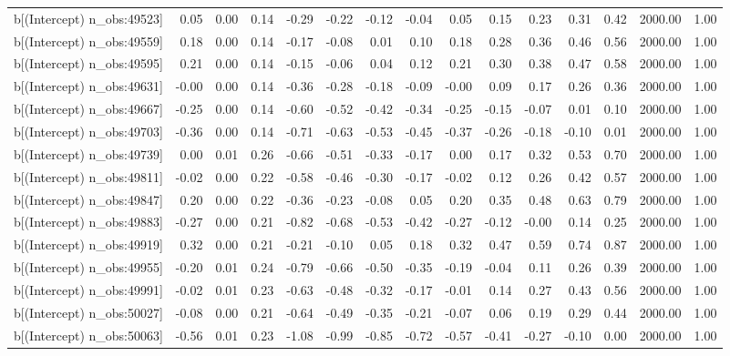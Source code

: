 \begin{table}[ht]
\begin{tabular}{rrrrrrrrrrrrrrr}
  b[(Intercept) n\_obs:49523] & 0.05 & 0.00 & 0.14 & -0.29 & -0.22 & -0.12 & -0.04 & 0.05 & 0.15 & 0.23 & 0.31 & 0.42 & 2000.00 & 1.00 \\ 
  b[(Intercept) n\_obs:49559] & 0.18 & 0.00 & 0.14 & -0.17 & -0.08 & 0.01 & 0.10 & 0.18 & 0.28 & 0.36 & 0.46 & 0.56 & 2000.00 & 1.00 \\ 
  b[(Intercept) n\_obs:49595] & 0.21 & 0.00 & 0.14 & -0.15 & -0.06 & 0.04 & 0.12 & 0.21 & 0.30 & 0.38 & 0.47 & 0.58 & 2000.00 & 1.00 \\ 
  b[(Intercept) n\_obs:49631] & -0.00 & 0.00 & 0.14 & -0.36 & -0.28 & -0.18 & -0.09 & -0.00 & 0.09 & 0.17 & 0.26 & 0.36 & 2000.00 & 1.00 \\ 
  b[(Intercept) n\_obs:49667] & -0.25 & 0.00 & 0.14 & -0.60 & -0.52 & -0.42 & -0.34 & -0.25 & -0.15 & -0.07 & 0.01 & 0.10 & 2000.00 & 1.00 \\ 
  b[(Intercept) n\_obs:49703] & -0.36 & 0.00 & 0.14 & -0.71 & -0.63 & -0.53 & -0.45 & -0.37 & -0.26 & -0.18 & -0.10 & 0.01 & 2000.00 & 1.00 \\ 
  b[(Intercept) n\_obs:49739] & 0.00 & 0.01 & 0.26 & -0.66 & -0.51 & -0.33 & -0.17 & 0.00 & 0.17 & 0.32 & 0.53 & 0.70 & 2000.00 & 1.00 \\ 
  b[(Intercept) n\_obs:49811] & -0.02 & 0.00 & 0.22 & -0.58 & -0.46 & -0.30 & -0.17 & -0.02 & 0.12 & 0.26 & 0.42 & 0.57 & 2000.00 & 1.00 \\ 
  b[(Intercept) n\_obs:49847] & 0.20 & 0.00 & 0.22 & -0.36 & -0.23 & -0.08 & 0.05 & 0.20 & 0.35 & 0.48 & 0.63 & 0.79 & 2000.00 & 1.00 \\ 
  b[(Intercept) n\_obs:49883] & -0.27 & 0.00 & 0.21 & -0.82 & -0.68 & -0.53 & -0.42 & -0.27 & -0.12 & -0.00 & 0.14 & 0.25 & 2000.00 & 1.00 \\ 
  b[(Intercept) n\_obs:49919] & 0.32 & 0.00 & 0.21 & -0.21 & -0.10 & 0.05 & 0.18 & 0.32 & 0.47 & 0.59 & 0.74 & 0.87 & 2000.00 & 1.00 \\ 
  b[(Intercept) n\_obs:49955] & -0.20 & 0.01 & 0.24 & -0.79 & -0.66 & -0.50 & -0.35 & -0.19 & -0.04 & 0.11 & 0.26 & 0.39 & 2000.00 & 1.00 \\ 
  b[(Intercept) n\_obs:49991] & -0.02 & 0.01 & 0.23 & -0.63 & -0.48 & -0.32 & -0.17 & -0.01 & 0.14 & 0.27 & 0.43 & 0.56 & 2000.00 & 1.00 \\ 
  b[(Intercept) n\_obs:50027] & -0.08 & 0.00 & 0.21 & -0.64 & -0.49 & -0.35 & -0.21 & -0.07 & 0.06 & 0.19 & 0.29 & 0.44 & 2000.00 & 1.00 \\ 
  b[(Intercept) n\_obs:50063] & -0.56 & 0.01 & 0.23 & -1.08 & -0.99 & -0.85 & -0.72 & -0.57 & -0.41 & -0.27 & -0.10 & 0.00 & 2000.00 & 1.00 \\ 

\end{tabular}
\end{table}
